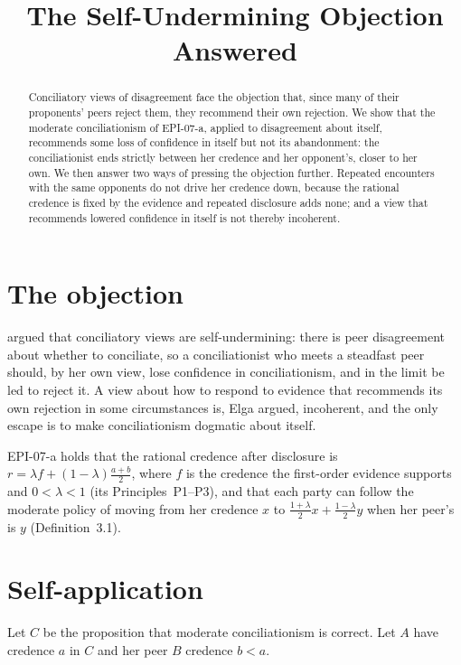 \documentclass{situationist-preprint}
\title{The Self-Undermining Objection Answered}
\begin{document}
\maketitle

\begin{abstract}
Conciliatory views of disagreement face the objection that, since many of their proponents' peers reject them, they recommend their own rejection. We show that the moderate conciliationism of EPI-07-a, applied to disagreement about itself, recommends some loss of confidence in itself but not its abandonment: the conciliationist ends strictly between her credence and her opponent's, closer to her own. We then answer two ways of pressing the objection further. Repeated encounters with the same opponents do not drive her credence down, because the rational credence is fixed by the evidence and repeated disclosure adds none; and a view that recommends lowered confidence in itself is not thereby incoherent.
\end{abstract}

\section{The objection}

\citet{Elga2010} argued that conciliatory views are self-undermining: there is peer disagreement about whether to conciliate, so a conciliationist who meets a steadfast peer should, by her own view, lose confidence in conciliationism, and in the limit be led to reject it. A view about how to respond to evidence that recommends its own rejection in some circumstances is, Elga argued, incoherent, and the only escape is to make conciliationism dogmatic about itself.

EPI-07-a holds that the rational credence after disclosure is $r = \lambda f + (1 - \lambda)\frac{a+b}{2}$, where $f$ is the credence the first-order evidence supports and $0 < \lambda < 1$ (its Principles~P1--P3), and that each party can follow the moderate policy of moving from her credence $x$ to $\frac{1+\lambda}{2}x + \frac{1-\lambda}{2}y$ when her peer's is $y$ (Definition~3.1).

\section{Self-application}

Let $C$ be the proposition that moderate conciliationism is correct. Let $A$ have credence $a$ in $C$ and her peer $B$ credence $b < a$.
\end{document}
